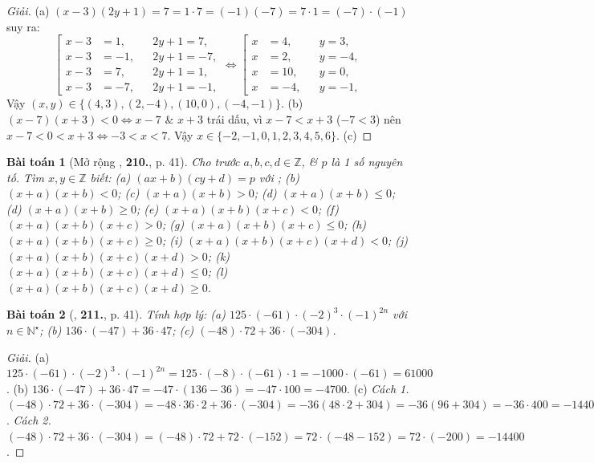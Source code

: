 \documentclass{article}
\numberwithin{equation}{section}
\newtheorem{baitoan}{Bài toán}
\begin{document}
\begin{proof}[Giải]
	(a) $(x - 3)(2y + 1) = 7 = 1\cdot 7 = (-1)(-7) = 7\cdot 1 = (-7)\cdot(-1)$ suy ra:
	\begin{equation*}
		\left[\begin{split}
			x - 3 &= 1,&&2y + 1 = 7,\\
			x - 3 &= -1,&&2y + 1 = -7,\\
			x - 3 &= 7,&&2y + 1 = 1,\\
			x - 3 &= -7,&&2y + 1 = -1,
		\end{split}\right.\Leftrightarrow
		\left[\begin{split}
			x &= 4,&&y = 3,\\
			x &= 2,&&y = -4,\\
			x &= 10,&&y = 0,\\
			x &= -4,&&y = -1,
		\end{split}\right.
	\end{equation*}
	Vậy $(x,y)\in\{(4,3),(2,-4),(10,0),(-4,-1)\}$. (b) $(x - 7)(x + 3) < 0\Leftrightarrow x - 7$ \& $x + 3$ trái dấu, vì $x - 7 < x + 3$ ($-7 < 3$) nên $x - 7< 0 < x + 3\Leftrightarrow-3 < x < 7$. Vậy $x\in\{-2,-1,0,1,2,3,4,5,6\}$. (c) 
\end{proof}

\begin{baitoan}[Mở rộng \cite{Tuyen_Toan_6}, \textbf{210.}, p. 41]
	Cho trước $a,b,c,d\in\mathbb{Z}$, \& $p$ là 1 số nguyên tố. Tìm $x,y\in\mathbb{Z}$ biết: (a) $(ax + b)(cy + d) = p$ với ; (b) $(x + a)(x + b) < 0$; (c) $(x + a)(x + b) > 0$; (d) $(x + a)(x + b)\le0$; (d) $(x + a)(x + b)\ge0$; (e) $(x + a)(x + b)(x + c) < 0$; (f) $(x + a)(x + b)(x + c) > 0$; (g) $(x + a)(x + b)(x + c)\le0$; (h) $(x + a)(x + b)(x + c)\ge0$; (i) $(x + a)(x + b)(x + c)(x + d) < 0$; (j) $(x + a)(x + b)(x + c)(x + d) > 0$; (k) $(x + a)(x + b)(x + c)(x + d)\le0$; (l) $(x + a)(x + b)(x + c)(x + d)\ge0$.
\end{baitoan}

\begin{baitoan}[\cite{Tuyen_Toan_6}, \textbf{211.}, p. 41]
	Tính hợp lý: (a) $125\cdot(-61)\cdot(-2)^3\cdot(-1)^{2n}$ với $n\in\mathbb{N}^\star$; (b) $136\cdot(-47) + 36\cdot47$; (c) $(-48)\cdot72 + 36\cdot(-304)$.
\end{baitoan}

\begin{proof}[Giải]
	(a) $125\cdot(-61)\cdot(-2)^3\cdot(-1)^{2n}= 125\cdot(-8)\cdot(-61)\cdot1 = -1000\cdot(-61) = 61000$. (b) $136\cdot(-47) + 36\cdot47 = -47\cdot(136 - 36) = -47\cdot100 = -4700$. (c) \textit{Cách 1.} $(-48)\cdot72 + 36\cdot(-304) = -48\cdot36\cdot2 + 36\cdot(-304) = -36(48\cdot2 + 304) = -36(96 + 304) = -36\cdot400 = -14400$. \textit{Cách 2.} $(-48)\cdot72 + 36\cdot(-304) = (-48)\cdot72 + 72\cdot(-152) = 72\cdot(-48 - 152) = 72\cdot(-200) = -14400$.
\end{proof}
\end{document}

